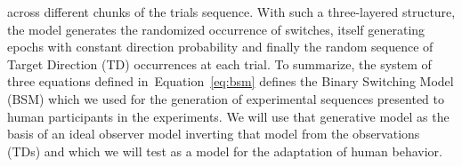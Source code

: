 \documentclass[12pt,english]{article}%
\newcommand{\seeFig}[1]{Figure~\ref{fig:#1}}
\newcommand{\seeEq}[1]{Equation~\ref{eq:#1}}
\begin{document}
across different chunks of the trials sequence.
With such a three-layered structure, the model generates the randomized occurrence of switches,
itself generating epochs with constant direction probability %
and finally the random sequence of Target Direction (TD) occurrences at each trial.
To summarize, the system of three equations defined in~\seeEq{bsm}
defines the Binary Switching Model (BSM)
which we used for the generation of experimental sequences presented to human participants in the experiments.
We will use that generative model as the basis of an ideal observer model 
inverting that model from the observations (TDs) and 
which we will test as a model for the adaptation of human behavior.
\end{document}
